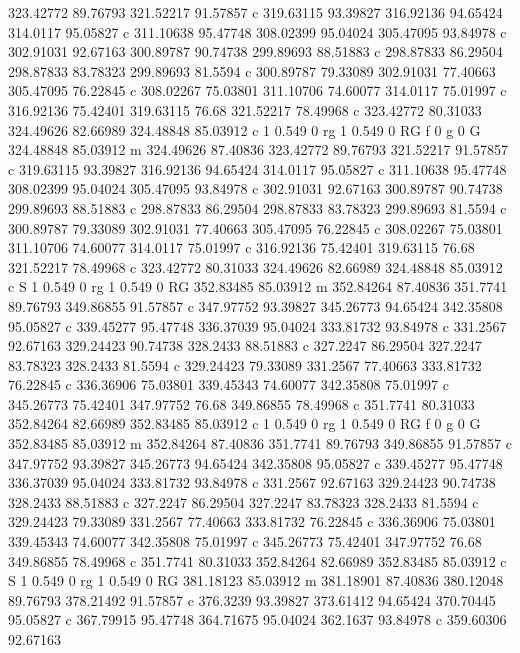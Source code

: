 323.42772 89.76793 
321.52217 91.57857 c 
319.63115 93.39827 
316.92136 94.65424 
314.0117 95.05827 c 
311.10638 95.47748 
308.02399 95.04024 
305.47095 93.84978 c 
302.91031 92.67163 
300.89787 90.74738 
299.89693 88.51883 c 
298.87833 86.29504 
298.87833 83.78323 
299.89693 81.5594 c 
300.89787 79.33089 
302.91031 77.40663 
305.47095 76.22845 c 
308.02267 75.03801 
311.10706 74.60077 
314.0117 75.01997 c 
316.92136 75.42401 
319.63115 76.68 
321.52217 78.49968 c 
323.42772 80.31033 
324.49626 82.66989 
324.48848 85.03912 c 
1 0.549 0 rg 1 0.549 0 RG f 
0 g 0 G 
324.48848 85.03912 m 
324.49626 87.40836 
323.42772 89.76793 
321.52217 91.57857 c 
319.63115 93.39827 
316.92136 94.65424 
314.0117 95.05827 c 
311.10638 95.47748 
308.02399 95.04024 
305.47095 93.84978 c 
302.91031 92.67163 
300.89787 90.74738 
299.89693 88.51883 c 
298.87833 86.29504 
298.87833 83.78323 
299.89693 81.5594 c 
300.89787 79.33089 
302.91031 77.40663 
305.47095 76.22845 c 
308.02267 75.03801 
311.10706 74.60077 
314.0117 75.01997 c 
316.92136 75.42401 
319.63115 76.68 
321.52217 78.49968 c 
323.42772 80.31033 
324.49626 82.66989 
324.48848 85.03912 c 
S 
1 0.549 0 rg 1 0.549 0 RG 
352.83485 85.03912 m 
352.84264 87.40836 
351.7741 89.76793 
349.86855 91.57857 c 
347.97752 93.39827 
345.26773 94.65424 
342.35808 95.05827 c 
339.45277 95.47748 
336.37039 95.04024 
333.81732 93.84978 c 
331.2567 92.67163 
329.24423 90.74738 
328.2433 88.51883 c 
327.2247 86.29504 
327.2247 83.78323 
328.2433 81.5594 c 
329.24423 79.33089 
331.2567 77.40663 
333.81732 76.22845 c 
336.36906 75.03801 
339.45343 74.60077 
342.35808 75.01997 c 
345.26773 75.42401 
347.97752 76.68 
349.86855 78.49968 c 
351.7741 80.31033 
352.84264 82.66989 
352.83485 85.03912 c 
1 0.549 0 rg 1 0.549 0 RG f 
0 g 0 G 
352.83485 85.03912 m 
352.84264 87.40836 
351.7741 89.76793 
349.86855 91.57857 c 
347.97752 93.39827 
345.26773 94.65424 
342.35808 95.05827 c 
339.45277 95.47748 
336.37039 95.04024 
333.81732 93.84978 c 
331.2567 92.67163 
329.24423 90.74738 
328.2433 88.51883 c 
327.2247 86.29504 
327.2247 83.78323 
328.2433 81.5594 c 
329.24423 79.33089 
331.2567 77.40663 
333.81732 76.22845 c 
336.36906 75.03801 
339.45343 74.60077 
342.35808 75.01997 c 
345.26773 75.42401 
347.97752 76.68 
349.86855 78.49968 c 
351.7741 80.31033 
352.84264 82.66989 
352.83485 85.03912 c 
S 
1 0.549 0 rg 1 0.549 0 RG 
381.18123 85.03912 m 
381.18901 87.40836 
380.12048 89.76793 
378.21492 91.57857 c 
376.3239 93.39827 
373.61412 94.65424 
370.70445 95.05827 c 
367.79915 95.47748 
364.71675 95.04024 
362.1637 93.84978 c 
359.60306 92.67163 
